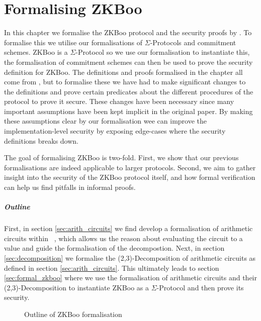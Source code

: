 \chapter{Formalising ZKBoo}
\label{ch:formal_zkboo}
In this chapter we formalise the ZKBoo protocol and the security proofs by
\citet{zkboo}. To formalise this we utilise our formalisations of
$\Sigma$-Protocols and commitment schemes. ZKBoo is a $\Sigma$-Protocol so we
use our formalisation to instantiate this, the formalisation of commitment
schemes can then be used to prove the security definition for ZKBoo.
The definitions and proofs formalised in the chapter all come from
\citet{zkboo}, but to formalise these we have had to make significant changes to
the definitions and prove certain predicates about the different procedures of
the protocol to prove it secure. These changes have been necessary since many
important assumptions have been kept implicit in the original paper. By
making these assumptions clear by our formalisation wee can improve the
implementation-level security by exposing edge-cases where the security
definitions breaks down.

The goal of formalising ZKBoo is two-fold. First, we show that our previous
formalisations are indeed applicable to larger protocols. Second, we aim to
gather insight into the security of the ZKBoo protocol itself, and how formal
verification can help us find pitfalls in informal proofs.

\paragraph{Outline}
First, in section \ref{sec:arith_circuits} we find develop a formalisation of
arithmetic circuits within \easycrypt\ , which allows us the reason about
evaluating the circuit to a value and guide the formalisation of the
decompostion. Next, in section \ref{sec:decomposition} we formalise the
(2,3)-Decomposition of arithmetic circuits as defined in section
\ref{sec:arith_circuits}.
This ultimately leads to section \ref{sec:formal_zkboo} where we use the
formalisation of arithmetic circuits and their (2,3)-Decomposition to
instantiate ZKBoo as a $\Sigma$-Protocol and then prove its security.


\begin{figure}[ht]
  \centering
  \caption{\label{fig:outline_zkboo} Outline of ZKBoo formalisation}
\end{figure}

